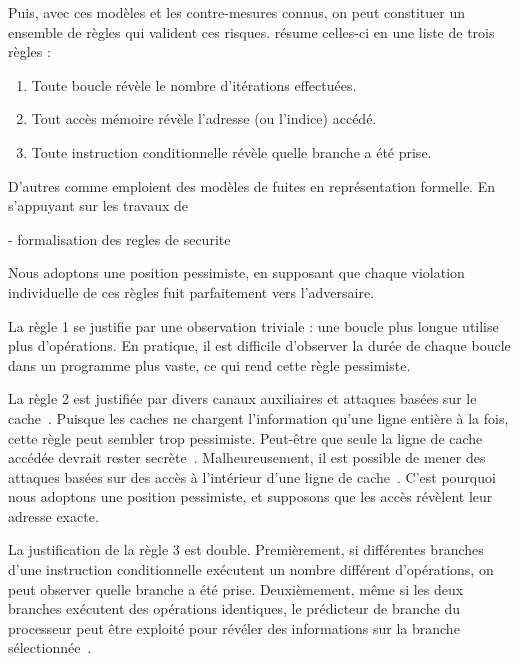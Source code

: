 Puis, avec ces modèles et les contre-mesures connus, on peut constituer un ensemble de règles qui valident ces risques. \cite{CTsaferCrypto} résume celles-ci en une liste de trois règles :
\begin{enumerate}
  \item Toute boucle révèle le nombre d'itérations effectuées. 
  \item Tout accès mémoire révèle l'adresse (ou l'indice) accédé.
  \item Toute instruction conditionnelle révèle quelle branche a été prise.
\end{enumerate}

D'autres comme \cite{binsecRel2019} emploient des modèles de fuites en représentation formelle. En s'appuyant sur les travaux de \citeauthor{formalConstantTime} \cite{formalConstantTime}


- formalisation des regles de securite





Nous adoptons une position pessimiste, en supposant que chaque violation individuelle de ces règles fuit parfaitement vers l'adversaire.

La règle 1 se justifie par une observation triviale : une boucle plus longue utilise plus d'opérations. En pratique, il est difficile d'observer la durée de chaque boucle dans un programme plus vaste, ce qui rend cette règle pessimiste.

La règle 2 est justifiée par divers canaux auxiliaires et attaques basées sur le cache~\cite{Ber05, YGH17, CAPGATB19}. Puisque les caches ne chargent l'information qu'une ligne entière à la fois, cette règle peut sembler trop pessimiste. Peut-être que seule la ligne de cache accédée devrait rester secrète~\cite{Bri11}. Malheureusement, il est possible de mener des attaques basées sur des accès à l'intérieur d'une ligne de cache~\cite{BS13, OST06, YGH17}. C'est pourquoi nous adoptons une position pessimiste, et supposons que les accès révèlent leur adresse exacte.

La justification de la règle 3 est double. Premièrement, si différentes branches d'une instruction conditionnelle exécutent un nombre différent d'opérations, on peut observer quelle branche a été prise. Deuxièmement, même si les deux branches exécutent des opérations identiques, le prédicteur de branche du processeur peut être exploité pour révéler des informations sur la branche sélectionnée~\cite{AKS06, AKS07, EPAG16}.


